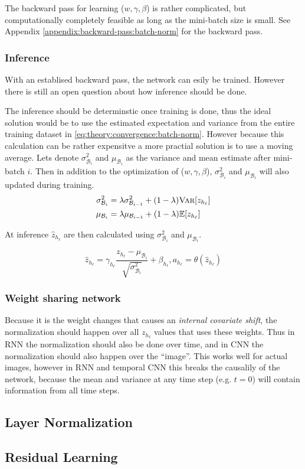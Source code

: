 The backward pass for learning ($w, \gamma, \beta$) is rather complicated, but computationally completely feasible as long as the mini-batch size is small. See Appendix \ref{appendix:backward-pass:batch-norm} for the backward pass.

\subsubsection{Inference}

With an establised backward pass, the network can esily be trained. However there is still an open question about how inference should be done.

The inference should be determinstic once training is done, thus the ideal solution would be to use the estimated expectation and variance from the entire training dataset in \eqref{eq:theory:convergence:batch-norm}. However because this calculation can be rather expensitve a more practial solution is to use a moving average. Lets denote $\sigma^2_{\mathcal{B}_i}$ and $\mu_{\mathcal{B}_i}$ as the variance and mean estimate after mini-batch $i$. Then in addition to the optimization of ($w, \gamma, \beta$), $\sigma^2_{\mathcal{B}_i}$ and $\mu_{\mathcal{B}_i}$ will also updated during training.
\begin{equation}
\begin{aligned}
\sigma^2_{\mathcal{B}_i} &= \lambda \sigma^2_{\mathcal{B}_{i-1}} + (1 - \lambda) \textsc{Var}[z_{h_\ell}] \\
\mu_{\mathcal{B}_i} &= \lambda \mu_{\mathcal{B}_{i-1}} + (1 - \lambda) \mathbb{E}[z_{h_\ell}]
\end{aligned}
\end{equation}

At inference $\hat{z}_{h_\ell}$ are then calculated using $\sigma^2_{\mathcal{B}_i}$ and $\mu_{\mathcal{B}_i}$.

\begin{equation}
\hat{z}_{h_\ell} = \gamma_{h_\ell} \frac{z_{h_\ell} - \mu_{\mathcal{B}_i}}{\sqrt{\sigma^2_{\mathcal{B}_i}}} + \beta_{h_\ell}, a_{h_\ell} = \theta(\hat{z}_{h_\ell})
\end{equation}

\subsubsection{Weight sharing network}

Because it is the weight changes that causes an \textit{internal covariate shift}, the normalization should happen over all $z_{h_\ell}$ values that uses these weights. Thus in RNN the normalization should also be done over time, and in CNN the normalization should also happen over the ``image''. This works well for actual images, however in RNN and temporal CNN this breaks the causalily of the network, because the mean and variance at any time step (e.g. $t=0$) will contain information from all time steps.

\subsection{Layer Normalization}
\cite{layer-normalization}

\subsection{Residual Learning}
\cite{residual-learning}
